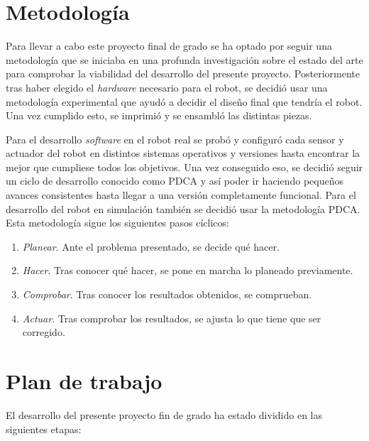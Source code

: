 \section{Metodología}
\label{sec:metodologia}

Para llevar a cabo este proyecto final de grado se ha optado por seguir una metodología que se iniciaba en una profunda investigación sobre el estado del arte para comprobar la viabilidad del desarrollo del presente proyecto. Posteriormente tras haber elegido el \textit{hardware} necesario para el robot, se decidió usar una metodología experimental que ayudó a decidir el diseño final que tendría el robot. Una vez cumplido esto, se imprimió y se ensambló las distintas piezas. 


Para el desarrollo \textit{software} en el robot real se probó y configuró cada sensor y actuador del robot en distintos sistemas operativos y versiones hasta encontrar la mejor que cumpliese todos los objetivos. Una vez conseguido eso, se decidió seguir un ciclo de desarrollo conocido como \ac{PDCA} y así poder ir haciendo pequeños avances consistentes hasta llegar a una versión completamente funcional. Para el desarrollo del robot en simulación también se decidió usar la metodología \acs{PDCA}. Esta metodología sigue los siguientes pasos cíclicos: 

\begin{enumerate}
	\item{\textit{Planear}}. Ante el problema presentado, se decide qué hacer.
	
	\item{\textit{Hacer}}. Tras conocer qué hacer, se pone en marcha lo planeado previamente.
	
	\item{\textit{Comprobar}}. Tras conocer los resultados obtenidos, se comprueban.
	
	\item{\textit{Actuar}}. Tras comprobar los resultados, se ajusta lo que tiene que ser corregido. 

\end{enumerate}


\section{Plan de trabajo}
\label{sec:plantrabajo}

El desarrollo del presente proyecto fin de grado ha estado dividido en las siguientes etapas: 

